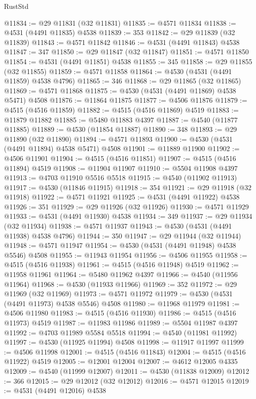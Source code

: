 \begin{lexlean}{RustStd}
\begin{coremodule}
@11834 := @29 @11831 (@32 @11831)
@11835 := @4571 @11834
@11838 := @4531 (@4491 @11835) @4538
@11839 := 353
@11842 := @29 @11839 (@32 @11839)
@11843 := @4571 @11842
@11846 := @4531 (@4491 @11843) @4538
@11847 := 347
@11850 := @29 @11847 (@32 @11847)
@11851 := @4571 @11850
@11854 := @4531 (@4491 @11851) @4538
@11855 := 345
@11858 := @29 @11855 (@32 @11855)
@11859 := @4571 @11858
@11864 := @4530 (@4531 (@4491 @11859) @4538 @4796)
@11865 := 346
@11868 := @29 @11865 (@32 @11865)
@11869 := @4571 @11868
@11875 := @4530 (@4531 (@4491 @11869) @4538 @5471) @4508
@11876 := @11864 @11875
@11877 := @4506 @11876
@11879 := @4515 (@4516 @11859)
@11882 := @4515 (@4516 @11869) @4519
@11883 := @11879 @11882
@11885 := @5480 @11883 @4397
@11887 := @4540 (@11877 @11885)
@11889 := @4530 (@11854 @11887)
@11890 := 348
@11893 := @29 @11890 (@32 @11890)
@11894 := @4571 @11893
@11900 := @4530 (@4531 (@4491 @11894) @4538 @5471) @4508
@11901 := @11889 @11900
@11902 := @4506 @11901
@11904 := @4515 (@4516 @11851)
@11907 := @4515 (@4516 @11894) @4519
@11908 := @11904 @11907
@11910 := @5504 @11908 @4397
@11913 := @4703 @11910 @5516 @5518
@11915 := @4540 (@11902 @11913)
@11917 := @4530 (@11846 @11915)
@11918 := 354
@11921 := @29 @11918 (@32 @11918)
@11922 := @4571 @11921
@11925 := @4531 (@4491 @11922) @4538
@11926 := 351
@11929 := @29 @11926 (@32 @11926)
@11930 := @4571 @11929
@11933 := @4531 (@4491 @11930) @4538
@11934 := 349
@11937 := @29 @11934 (@32 @11934)
@11938 := @4571 @11937
@11943 := @4530 (@4531 (@4491 @11938) @4538 @4796)
@11944 := 350
@11947 := @29 @11944 (@32 @11944)
@11948 := @4571 @11947
@11954 := @4530 (@4531 (@4491 @11948) @4538 @5546) @4508
@11955 := @11943 @11954
@11956 := @4506 @11955
@11958 := @4515 (@4516 @11938)
@11961 := @4515 (@4516 @11948) @4519
@11962 := @11958 @11961
@11964 := @5480 @11962 @4397
@11966 := @4540 (@11956 @11964)
@11968 := @4530 (@11933 @11966)
@11969 := 352
@11972 := @29 @11969 (@32 @11969)
@11973 := @4571 @11972
@11979 := @4530 (@4531 (@4491 @11973) @4538 @5546) @4508
@11980 := @11968 @11979
@11981 := @4506 @11980
@11983 := @4515 (@4516 @11930)
@11986 := @4515 (@4516 @11973) @4519
@11987 := @11983 @11986
@11989 := @5504 @11987 @4397
@11992 := @4703 @11989 @5584 @5518
@11994 := @4540 (@11981 @11992)
@11997 := @4530 (@11925 @11994) @4508
@11998 := @11917 @11997
@11999 := @4506 @11998
@12001 := @4515 (@4516 @11843)
@12004 := @4515 (@4516 @11922) @4519
@12005 := @12001 @12004
@12007 := @4612 @12005 @4335
@12009 := @4540 (@11999 @12007)
@12011 := @4530 (@11838 @12009)
@12012 := 366
@12015 := @29 @12012 (@32 @12012)
@12016 := @4571 @12015
@12019 := @4531 (@4491 @12016) @4538

\end{coremodule}
\end{lexlean}
